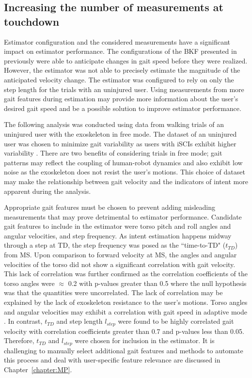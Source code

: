 \subsection{Increasing the number of measurements at touchdown}\label{sec:increase_meas}
Estimator configuration and the considered measurements have a significant impact on estimator performance. The configurations of the BKF presented in previously were able to anticipate changes in gait speed before they were realized. However, the estimator was not able to precisely estimate the magnitude of the anticipated velocity change. The estimator was configured to rely on only the step length for the trials with an uninjured user. Using measurements from more gait features during estimation may provide more information about the user's desired gait speed and be a possible solution to improve estimator performance.

The following analysis was conducted using data from walking trials of an uninjured user with the exoskeleton in free mode. The dataset of an uninjured user was chosen to minimize gait variability as users with iSCIs exhibit higher variability \cite{sohn2018variability}. There are two benefits of considering trials in free mode; gait patterns may reflect the coupling of human-robot dynamics and also exhibit low noise as the exoskeleton does not resist the user's motions. This choice of dataset may make the relationship between gait velocity and the indicators of intent more apparent during the analysis. 

Appropriate gait features must be chosen to prevent adding misleading measurements that may prove detrimental to estimator performance. Candidate gait features to include in the estimator were torso pitch and roll angles and angular velocities, and step frequency. As intent estimation happens midway through a step at TD, the step frequency was posed as the ``time-to-TD" ($ t_{TD} $) from MS. Upon comparison to forward velocity at MS, the angles and angular velocities of the torso did not show a significant correlation with gait velocity. This lack of correlation was further confirmed as the correlation coefficients of the torso angles were $ \approx $ 0.2 with p-values greater than 0.5 where the null hypothesis was that the quantities were uncorrelated. The lack of correlation may be explained by the lack of exoskeleton resistance to the user's motions. Torso angles and angular velocities may exhibit a correlation with gait speed in adaptive mode \cite{suzuki2007intention}. In contrast, $ t_{TD} $ and step length $ l_{step} $ were found to be highly correlated gait velocity with correlation coefficients greater than 0.7 and p-values less than 0.05. Therefore, $ t_{TD} $ and $ l_{step} $ were chosen for inclusion in the estimator. It is challenging to manually select additional gait features and methods to automate this process and deal with user-specific feature relevance are discussed in Chapter~\ref{chapter:MP}.

